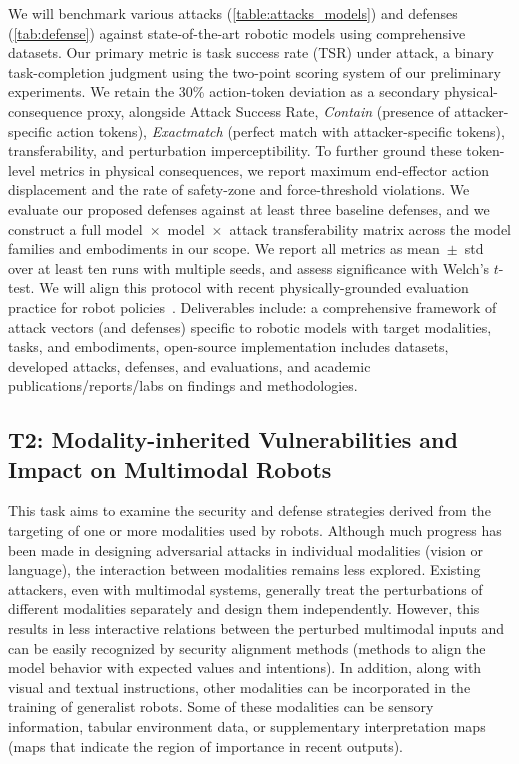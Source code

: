 We will benchmark various attacks (\autoref{table:attacks_models}) and defenses (\autoref{tab:defense}) against state-of-the-art robotic models using comprehensive datasets. Our primary metric is task success rate (TSR) under attack, a binary task-completion judgment using the two-point scoring system of our preliminary experiments. We retain the 30\% action-token deviation as a secondary physical-consequence proxy, alongside Attack Success Rate, \textit{Contain} \cite{lu2024test} (presence of attacker-specific action tokens), \textit{Exactmatch} \cite{luo2024image,lu2024test} (perfect match with attacker-specific tokens), transferability, and perturbation imperceptibility. 
To further ground these token-level metrics in physical consequences, we report maximum end-effector action displacement and the rate of safety-zone and force-threshold violations. We evaluate our proposed defenses against at least three baseline defenses, and we construct a full model~$\times$~model~$\times$~attack transferability matrix across the model families and embodiments in our scope. We report all metrics as mean~$\pm$~std over at least ten runs with multiple seeds, and assess significance with Welch's $t$-test.
We will align this protocol with recent physically-grounded evaluation practice for robot policies~\cite{sun2026maniparena}.
Deliverables include:  a comprehensive framework of attack vectors (and defenses) specific to robotic models
with target modalities, tasks, and embodiments,  open-source implementation includes datasets, developed attacks, defenses, and evaluations, and  academic publications/reports/labs on findings and methodologies.




\subsection{T2: Modality-inherited Vulnerabilities and Impact on Multimodal Robots} \label{sec:t2}
This task aims to examine the security and defense strategies derived from the targeting of one or more modalities used by robots. 
Although much progress has been made in designing adversarial attacks in individual modalities (\eg vision or language), the interaction between modalities remains less explored. Existing attackers, even with multimodal systems, generally treat the perturbations of different modalities separately and design them independently. 
However, this results in less interactive relations between the perturbed multimodal inputs and can be easily recognized by security alignment methods (\ie methods
to align the model behavior with expected values and intentions). 
In addition, along with visual and textual instructions, other modalities can be incorporated in the training of generalist robots. Some of these modalities can be sensory information, tabular environment data, or supplementary interpretation maps (\ie maps that indicate the region of importance in recent outputs). 

